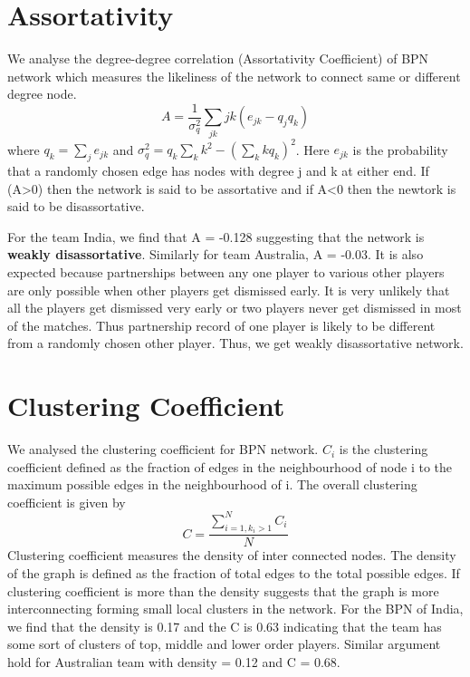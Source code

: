 \documentclass{article}
\begin{document}
\section{Assortativity}
We analyse the degree-degree correlation (Assortativity Coefficient) of BPN network which measures the likeliness of the network to connect same or different degree node. $$A = \frac{1}{\sigma_{q}^2}\sum_{jk}jk(e_{jk} - q_jq_k)$$ where $q_k = \sum_{j} e_{jk}$ and $\sigma_{q}^2 = q_k\sum_{k}k^2 - (\sum_{k}kq_{k})^2$. Here $e_{jk}$ is the probability that a randomly chosen edge has nodes with degree j and k at either end. If (A>0) then the network is said to be assortative and if A<0 then the newtork is said to be disassortative.

\begin{table}[!h]
\end{table}

For the team India, we find that A = -0.128 suggesting that the network is  \textbf{weakly disassortative}. Similarly for team Australia, A = -0.03. It is also expected because partnerships between any one player to various other players are only possible when other players get dismissed early. It is very unlikely that all the players get dismissed very early or two players never get dismissed in most of the matches. Thus partnership record of one player is likely to be different from a randomly chosen other player. Thus, we get weakly disassortative network.

\section{Clustering Coefficient}
We analysed the clustering coefficient for BPN network. $C_i$ is the clustering coefficient defined as the fraction of edges in the neighbourhood of node i to the maximum possible edges in the neighbourhood of i. The overall clustering coefficient is given by $$C = \frac{\sum_{i=1,k_i > 1}^N C_{i}}{N}$$ Clustering coefficient measures the density of inter connected nodes. The density of the graph is defined as the fraction of total edges to the total possible edges. If clustering coefficient is more than the density suggests that the graph is more interconnecting forming small local clusters in the network. For the BPN of India, we find that the density is 0.17 and the C is 0.63 indicating that the team has some sort of clusters of top, middle and lower order players. Similar argument hold for Australian team with density = 0.12 and C = 0.68.
\end{document}
